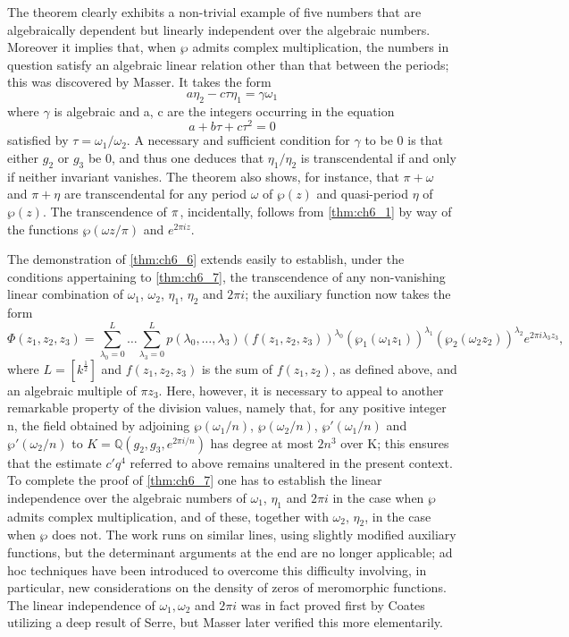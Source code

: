 The theorem clearly exhibits a non-trivial example of five numbers that are algebraically dependent but linearly independent over the algebraic numbers. Moreover it implies that, when $\wp$ admits complex multiplication, the numbers in question satisfy an algebraic linear relation other than that between the periods; this was discovered by Masser. It takes the form
\[a\eta_{2}-c\tau\eta_{1}=\gamma\omega_{1}\]
where $\gamma$ is algebraic and a, c are the integers occurring in the equation
\[a + b\tau + c\tau^2 = 0\]
satisfied by $\tau = \omega_1/\omega_2$. A necessary and sufficient condition for $\gamma$ to be 0 is that either $g_2$ or $g_3$ be 0, and thus one deduces that $\eta_1/\eta_2$ is transcendental if and only if neither invariant vanishes. The theorem also shows, for instance, that $\pi + \omega$ and  $\pi + \eta$ are transcendental for any period $\omega$ of $\wp(z)$ and quasi-period $\eta$ of $\wp(z)$. The transcendence of $\pi\index{transcendence of  $\pi$}$, incidentally, follows from \autoref{thm:ch6_1} by way of the functions $\wp(\omega z/\pi)$ and $e^{2\pi iz}$.

The demonstration of \autoref{thm:ch6_6} extends easily to establish, under the conditions appertaining to \autoref{thm:ch6_7}, the transcendence of any non-vanishing linear combination of $\omega_1$, $\omega_2$, $\eta_1$, $\eta_2$ and $2\pi i$; the auxiliary function now takes the form
\[ \Phi(z_1,z_2,z_3) = \sum_{\lambda_0=0}^L \dots \sum_{\lambda_3=0}^L p(\lambda_0,\dots,\lambda_3) (f(z_1,z_2,z_3))^{\lambda_0} (\wp_1(\omega_1z_1))^{\lambda_1} (\wp_2(\omega_2z_2))^{\lambda_2} e^{2\pi i \lambda_3 z_3}, \]
where $L = [k^{\frac{1}{2}}]$ and $f(z_1, z_2, z_3)$ is the sum of $f(z_1, z_2)$, as defined above, and an algebraic multiple of $\pi z_3$. Here, however, it is necessary to appeal to another remarkable property of the division values, namely that, for any positive integer n, the field obtained by adjoining $\wp(\omega_1/n)$, $\wp(\omega_2/n)$, $\wp'(\omega_1/n)$ and $\wp'(\omega_2/n)$ to $K = \mathbb{Q}(g_2, g_3, e^{2\pi i/n})$ has degree at most $2n^3$ over K; this ensures that the estimate $c'q^4$ referred to above remains unaltered in the present context. To complete the proof of \autoref{thm:ch6_7} one has to establish the linear independence over the algebraic numbers of $\omega_1$, $\eta_1$ and $2\pi i$ in the case when $\wp$ admits complex multiplication, and of these, together with $\omega_2$, $\eta_2$, in the case when $\wp$ does not. The work runs on similar lines, using slightly modified auxiliary functions, but the determinant arguments at the end are no longer applicable; ad hoc techniques have been introduced to overcome this difficulty involving, in particular, new considerations on the density of zeros of meromorphic functions. The linear independence of $\omega_1, \omega_2$ and $2\pi i$ was in fact proved first by Coates utilizing a deep result of Serre, but Masser later verified this more elementarily.

